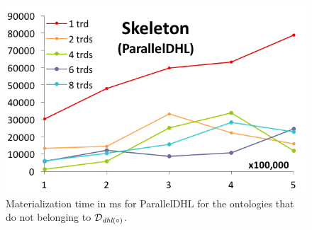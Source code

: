 \begin{figure}[htbp]
\begin{minipage}{.24\textwidth}
  \end{minipage}
  \begin{minipage}{.24\textwidth}
    \includegraphics[width=\textwidth]{experimentalResults/4-skeleton-simple}
  \end{minipage}
  \caption{Materialization time in ms for ParallelDHL for the
    ontologies that do not belonging to $\mathcal{D}_{\textit{\text{dhl}}(\circ)}$.~\label{fig:eval}}
\end{figure}

